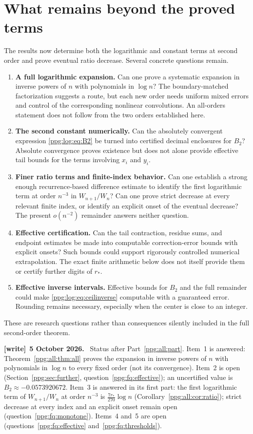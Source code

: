 \documentclass[11pt,letterpaper]{article}
\theoremstyle{remark}\newtheorem{remark}[theorem]{Remark}
\numberwithin{equation}{section}
\newenvironment{writenote}[1][]{\par\smallskip\begingroup\small
 \noindent\textbf{[write]}\if\relax\detokenize{#1}\relax\else~\textbf{#1.}\fi\ }%
 {\par\endgroup\smallskip}
\begin{document}
\section{What remains beyond the proved terms}\label{ppg:log:sec:open}
The results now determine both the logarithmic and constant terms at second order and prove eventual ratio decrease. Several concrete questions remain.
\begin{enumerate}
\item \textbf{A full logarithmic expansion.} Can one prove a systematic expansion in inverse powers of $n$ with polynomials in $\log n$? The boundary-matched factorization suggests a route, but each new order needs uniform mixed errors and control of the corresponding nonlinear convolutions. An all-orders statement does not follow from the two orders established here.
\item \textbf{The second constant numerically.} Can the absolutely convergent expression \eqref{ppg:log:eq:B2} be turned into certified decimal enclosures for $B_2$? Absolute convergence proves existence but does not alone provide effective tail bounds for the terms involving $x_i$ and $y_i$.
\item \textbf{Finer ratio terms and finite-index behavior.} Can one establish a strong enough recurrence-based difference estimate to identify the first logarithmic term at order $n^{-3}$ in $W_{n+1}/W_n$? Can one prove strict decrease at every relevant finite index, or identify an explicit onset of the eventual decrease? The present $o(n^{-2})$ remainder answers neither question.
\item \textbf{Effective certification.} Can the tail contraction, residue sums, and endpoint estimates be made into computable correction-error bounds with explicit onsets? Such bounds could support rigorously controlled numerical extrapolation. The exact finite arithmetic below does not itself provide them or certify further digits of $r_*$.
\item \textbf{Effective inverse intervals.} Effective bounds for $B_2$ and the full remainder could make \eqref{ppg:log:eq:ceilinverse} computable with a guaranteed error. Rounding remains necessary, especially when the center is close to an integer.
\end{enumerate}
These are research questions rather than consequences silently included in the full second-order theorem.
\begin{writenote}[5 October 2026]
Status after Part~\ref{ppg:all:part}. Item~1 is answered: Theorem~\ref{ppg:all:thm:all} proves the expansion in inverse powers of $n$ with polynomials in $\log n$ to every fixed order (not its convergence). Item~2 is open (Section~\ref{ppg:sec:further}, question~\ref{ppg:fq:effective}); an uncertified value is $B_2\approx-0.0573920672$. Item~3 is answered in its first part: the first logarithmic term of $W_{n+1}/W_n$ at order $n^{-3}$ is $\frac{7r_*}{270}\log n$ (Corollary~\ref{ppg:all:cor:ratio}); strict decrease at every index and an explicit onset remain open (question~\ref{ppg:fq:monotone}). Items~4 and~5 are open (questions~\ref{ppg:fq:effective} and~\ref{ppg:fq:thresholds}).
\end{writenote}
\end{document}
